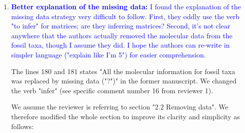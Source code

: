 \documentclass[12pt,letterpaper]{article}
\begin{document}
\begin{enumerate}


\item{\textcolor{blue}{\textbf{Better explanation of the missing data:} I found the explanation of the missing data strategy very difficult to follow. First, they oddly use the verb "to infer" for matrices; are they inferring matrices? Second, it's not clear anywhere that the authors actually removed the molecular data from the fossil taxa, though I assume they did. I hope the authors can re-write in simpler language ("explain like I'm 5") for easier comprehension.}}

The lines 180 and 181 states "All the molecular information for fossil taxa was replaced by missing data ("?")" in the former manuscript. We changed the verb "infer" (see specific comment number 16 from reviewer 1).

We assume the reviewer is referring to section "2.2 Removing data". We therefore modified the whole section to improve its clarity and simplicity as follows:


\end{enumerate}
\end{document}
